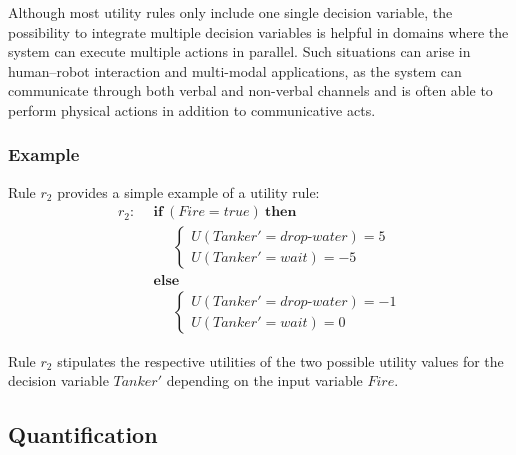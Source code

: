 Although most utility rules only include one single decision variable, the possibility to integrate multiple decision variables is helpful in domains where the system can execute multiple actions in parallel. Such situations can arise in human--robot interaction and multi-modal applications, as the system can communicate through both verbal and non-verbal channels and is often able to perform physical actions in addition to communicative acts. 
 
\subsubsection*{Example}

Rule $r_2$ provides a simple example of a utility rule:
\begin{align*}
r_2: \ \ & \textbf{if} \ (\mathit{Fire}\!=\!\mathit{true}) \ \textbf{then} \\
& \;\;\;\;\;  \begin{cases}
U(\mathit{Tanker}'\!=\!\mathit{drop\mbox{-}water}) = 5 \\
U(\mathit{Tanker}'\!=\!\mathit{wait}) = -5
\end{cases} \\
& \textbf{else} \\
& \;\;\;\;\; \begin{cases}
U (\mathit{Tanker}'\!=\!\mathit{drop\mbox{-}water}) = -1 \\
U(\mathit{Tanker}'\!=\!\mathit{wait}) = 0
\end{cases}
\end{align*}

Rule $r_2$ stipulates the respective utilities of the two possible utility values for the decision variable $\mathit{Tanker}'$ depending on the input variable $\mathit{Fire}$. 

\subsection{Quantification}
\label{sec:quantification}

